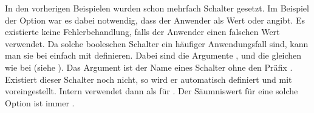 \begin{Declaration}
\end{Declaration}
In den vorherigen Beispielen wurden schon mehrfach Schalter gesetzt. Im
Beispiel der Option  war es dabei notwendig, dass der
Anwender als Wert  oder  angibt. Es existierte
keine Fehlerbehandlung, falls der Anwender einen falschen Wert verwendet. Da
solche booleschen Schalter ein häufiger Anwendungsfall sind, kann man sie bei
 einfach mit  definieren. Dabei sind die
Argumente ,  und  die gleichen
wie bei  (siehe
). Das Argument 
ist der Name eines Schalter ohne den Präfix . Existiert dieser
Schalter noch nicht, so wird er automatisch definiert und mit 
voreingestellt. Intern verwendet  dann
 als  für
. Der Säumniswert für eine solche
Option ist immer .

